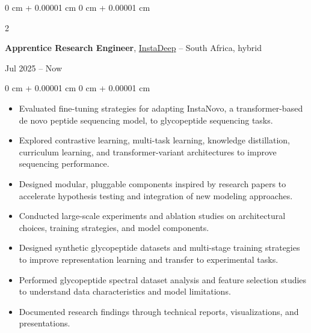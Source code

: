 \documentclass[10pt, letterpaper]{article}
\newenvironment{highlights}{
    \begin{itemize}[
        topsep=0.10 cm,
        parsep=0.10 cm,
        partopsep=0pt,
        itemsep=0pt,
        leftmargin=0 cm + 10pt
    ]
}{
    \end{itemize}
} %
\newenvironment{onecolentry}{
    \begin{adjustwidth}{
        0 cm + 0.00001 cm
    }{
        0 cm + 0.00001 cm
    }
}{
    \end{adjustwidth}
} %
\newenvironment{twocolentry}[2][]{
    \onecolentry
    \def\secondColumn{#2}
    \setcolumnwidth{\fill, 3.5 cm} %
    \begin{paracol}{2}
}{
    \switchcolumn \raggedleft \secondColumn
    \end{paracol}
    \endonecolentry
} %
\let\hrefWithoutArrow\href
\begin{document}
    
        
            \begin{twocolentry}{
                Jul 2025 -- Now
            }
                \textbf{Apprentice Research Engineer}, \hrefWithoutArrow{https://instadeep.com/}{InstaDeep} -- South Africa, hybrid
            \end{twocolentry}

            \vspace{0.10 cm}
            \begin{onecolentry}
                \begin{highlights}
                    
                        \item Evaluated fine-tuning strategies for adapting InstaNovo, a transformer-based de novo peptide sequencing model, to glycopeptide sequencing tasks.
                    
                        \item Explored contrastive learning, multi-task learning, knowledge distillation, curriculum learning, and transformer-variant architectures to improve sequencing performance.
                    
                        \item Designed modular, pluggable components inspired by research papers to accelerate hypothesis testing and integration of new modeling approaches.
                    
                        \item Conducted large-scale experiments and ablation studies on architectural choices, training strategies, and model components.
                    
                        \item Designed synthetic glycopeptide datasets and multi-stage training strategies to improve representation learning and transfer to experimental tasks.
                    
                        \item Performed glycopeptide spectral dataset analysis and feature selection studies to understand data characteristics and model limitations.
                    
                        \item Documented research findings through technical reports, visualizations, and presentations.
                    
                \end{highlights}
            \end{onecolentry}
            \vspace{0.2 cm}
        
\end{document}
